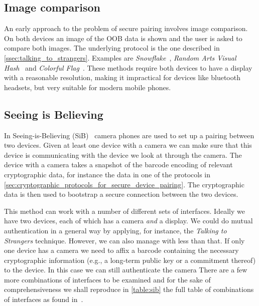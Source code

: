 \documentclass[conference, 11pt]{sty/IEEEtran}
\begin{document}
\subsection{Image comparison}
An early approach to the problem of secure pairing involves image comparison.
On both devices an image of the OOB data is shown and the user is asked to compare both images.
The underlying protocol is the one described in \autoref{ssec:talking_to_strangers}.
Examples are \textit{Snowflake}~\cite{goldberg1996visual}, \textit{Random Arts Visual Hash}~\cite{perrig1999hash} and \textit{Colorful Flag}~\cite{dohrmann2002public}.
These methods require both devices to have a display with a reasonable resolution, making it impractical for devices like bluetooth headsets, but very suitable for modern mobile phones.

\subsection{Seeing is Believing}
In Seeing-is-Believing (SiB)~\cite{mccune2005seeing} camera phones are used to set up a pairing between two devices.
Given at least one device with a camera we can make sure that this device is communicating with the device we look at through the camera.
The device with a camera takes a snapshot of the barcode encoding of relevant cryptographic data, for instance the data in one of the protocols in \autoref{sec:cryptographic_protocols_for_secure_device_pairing}.
The cryptographic data is then used to bootstrap a secure connection between the two devices.

This method can work with a number of different sets of interfaces.
Ideally we have two devices, each of which has a camera \emph{and} a display.
We could do mutual authentication in a general way by applying, for instance, the \emph{Talking to Strangers} technique.
However, we can also manage with less than that.
If only one device has a camera we need to affix a barcode containing the necessary cryptographic information (e.g., a long-term public key or a commitment thereof) to the device.
In this case we can still authenticate the camera 
There are a few more combinations of interfaces to be examined and for the sake of comprehensiveness we shall reproduce in \autoref{table:sib} the full table of combinations of interfaces as found in~\cite{mccune2005seeing}.
\end{document}
